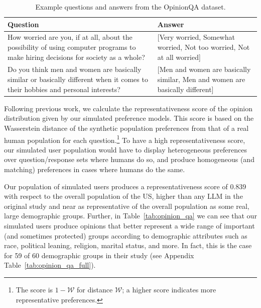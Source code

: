 \begin{table}[!ht]
    \centering
    \begin{tabular}{p{} p{}}
    \toprule
     Question & Answer\\
    \midrule
    How worried are you, if at all, about the possibility of using computer programs to make hiring decisions for society as a whole? & [Very worried, Somewhat worried, Not too worried, Not at all worried] \\
    \midrule
    Do you think men and women are basically similar or basically different when it comes to their hobbies and personal interests? & [Men and women are basically similar, Men and women are basically different] \\
    \bottomrule
    \end{tabular}
    \caption{Example questions and answers from the OpinionQA dataset.}
    \label{tab:opinion_qa_examples}

\end{table}

Following previous work, we calculate the representativeness score of the opinion distribution given by our simulated preference models.
This score is based on the Wasserstein distance of the synthetic population preferences from that of a real human population for each question.\footnote{The score is $1-\mathcal{W}$ for distance $\mathcal{W}$; a higher score indicates more representative preferences.}
To have a high representativeness score, our simulated user population would have to display heterogeneous preferences over question/response sets where humans do so, and produce homogeneous (and matching) preferences in cases where humans do the same. 

Our population of simulated users produces a representativeness score of 0.839 with respect to the overall population of the US, higher than any LLM in the original study and near as representative of the overall population as some real, large demographic groups.  
Further, in Table~\ref{tab:opinion_qa} we can see that our simulated users produce opinions that better represent a wide range of important (and sometimes protected) groups according to demographic attributes such as race, political leaning, religion, marital status, and more.  
In fact, this is the case for 59 of 60 demographic groups in their study (see Appendix Table~\ref{tab:opinion_qa_full}).

